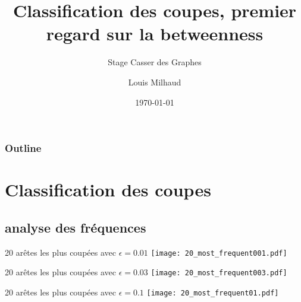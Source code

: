 \documentclass[aspectratio=169]{beamer}
\title{Classification des coupes, premier regard sur la betweenness}
\subtitle{Stage Casser des Graphes}
\author{Louis Milhaud}
\institute{Complex Networks - LIP6}
\date{\today}
\begin{document}
    \begin{frame}
        \titlepage
    \end{frame}

    \begin{frame}
        \frametitle{Outline}
        \tableofcontents
    \end{frame}

    \section{Classification des coupes}

    \subsection{analyse des fréquences}
    \begin{frame}{20 arêtes les plus coupées avec $\epsilon = 0.01$}
        \texttt{[image: 20\_most\_frequent001.pdf]}
    \end{frame}

    \begin{frame}{20 arêtes les plus coupées avec $\epsilon = 0.03$}
        \texttt{[image: 20\_most\_frequent003.pdf]}
    \end{frame}

    \begin{frame}{20 arêtes les plus coupées avec $\epsilon = 0.1$}
        \texttt{[image: 20\_most\_frequent01.pdf]}
    \end{frame}
\end{document}
